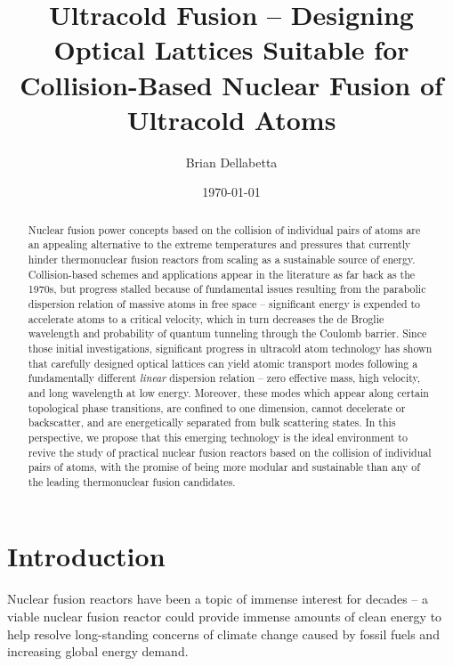 \documentclass[onecolumn,
               superscriptaddress,
               floatfix,
               longbibliography, 
               showkeys,apl]{revtex4-2}
\begin{document}
\title{Ultracold Fusion -- Designing Optical Lattices Suitable for Collision-Based Nuclear Fusion of Ultracold Atoms}

\author{Brian Dellabetta}


\date{\today}
%
\begin{abstract}
Nuclear fusion power concepts based on the collision of individual pairs of atoms are an appealing alternative to the extreme temperatures and pressures that currently hinder thermonuclear fusion reactors from scaling as a sustainable source of energy. Collision-based schemes and applications appear in the literature as far back as the 1970s, but progress stalled because of fundamental issues resulting from the parabolic dispersion relation of massive atoms in free space -- significant energy is expended to accelerate atoms to a critical velocity, which in turn decreases the de Broglie wavelength and probability of quantum tunneling through the Coulomb barrier. Since those initial investigations, significant progress in ultracold atom technology has shown that carefully designed optical lattices can yield atomic transport modes following a fundamentally different \textit{linear} dispersion relation -- zero effective mass, high velocity, and long wavelength at low energy. Moreover, these modes which appear along certain topological phase transitions, are confined to one dimension, cannot decelerate or backscatter, and are energetically separated from bulk scattering states. In this perspective, we propose that this emerging technology is the ideal environment to revive the study of practical nuclear fusion reactors based on the collision of individual pairs of atoms, with the promise of being more modular and sustainable than any of the leading thermonuclear fusion candidates.

\end{abstract}

\maketitle

\section{Introduction}

Nuclear fusion reactors have been a topic of immense interest for decades -- a viable nuclear fusion reactor could provide immense amounts of clean energy to help resolve long-standing concerns of climate change caused by fossil fuels and increasing global energy demand.
\end{document}
